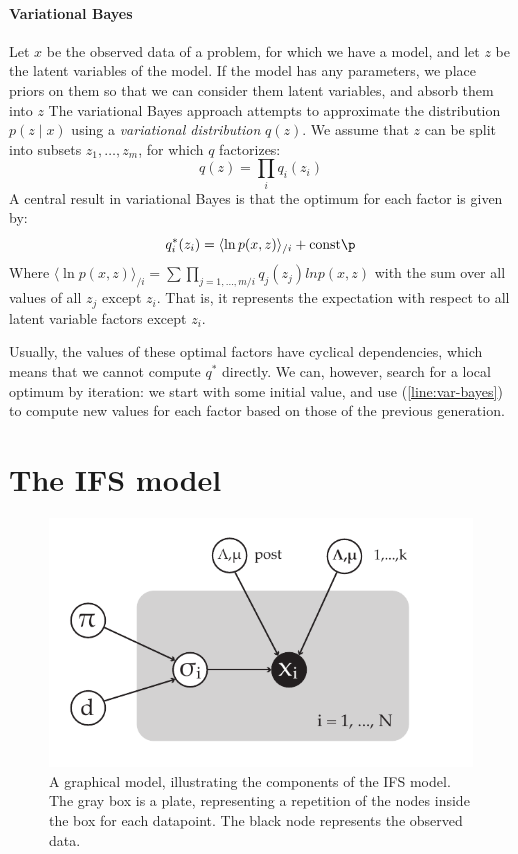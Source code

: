 \paragraph{Variational Bayes} Let $x$ be the observed data of a problem, for which we have a model, and let $z$ be the latent variables of the model. If the model has any parameters, we place priors on them so that we can consider them latent variables, and absorb them into $z$ The variational Bayes approach attempts to approximate the distribution $p(z \mid x)$ using a \emph{variational distribution} $q(z)$. We assume that $z$ can be split into subsets $z_1, \ldots, z_m$, for which $q$ factorizes:
\[
q(z) = \prod_i q_i(z_i)
\]
A central result in variational Bayes is that the optimum for each factor is given by:
\begin{equation}
q^*_i(z_i) = \langle \ln p(x, z)\rangle_{/i} + \text {const} \p \label{line:var-bayes}
\end{equation}
Where $\langle \ln p(x, z) \rangle_{/i} = \sum \prod_{j = {1, \ldots, m}/i} q_j(z_j) ln p(x, z)$ with the sum over all values of all $z_j$ except $z_i$. That is, it represents the expectation with respect to all latent variable factors except $z_i$. 

Usually, the values of these optimal factors have cyclical dependencies, which means that we cannot compute $q^*$ directly. We can, however, search for a local optimum by iteration: we start with some initial value, and use (\ref{line:var-bayes}) to compute new values for each factor based on those of the previous generation.  

\section{The IFS model}

\begin{figure}[t]
  \includegraphics[width=\textwidth]{./images/factor-graph.pdf}
  \caption{A graphical model, illustrating the components of the IFS model. The gray box is a plate, representing a repetition of the nodes inside the box for each datapoint. The black node represents the observed data.}
  \label{figure:ifs-diagram}
\end{figure}

